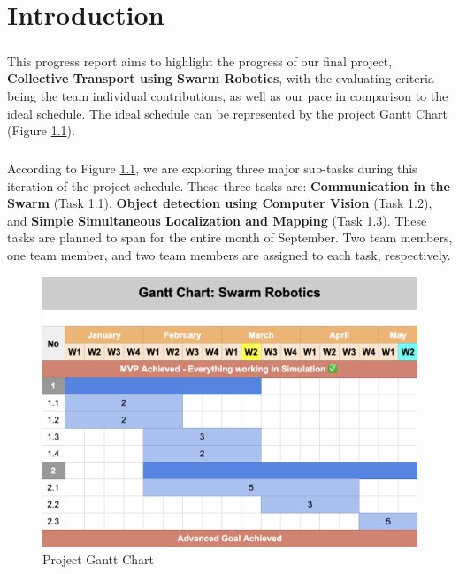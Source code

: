 \chapter{Introduction}

\paragraph*{}
This progress report aims to highlight the progress of our final project, \textbf{Collective Transport using Swarm Robotics}, with the evaluating criteria being the team individual contributions, as well as our pace in comparison to the ideal schedule. The ideal schedule can be represented by the project Gantt Chart (Figure \ref{fig:gantt_chart}).

\paragraph*{}
According to Figure \ref{fig:gantt_chart}, we are exploring three major sub-tasks during this iteration of the project schedule. These three tasks are: \textbf{Communication in the Swarm} (Task 1.1), \textbf{Object detection using Computer Vision} (Task 1.2), and \textbf{Simple Simultaneous Localization and Mapping} (Task 1.3). These tasks are planned to span for the entire month of September. Two team members, one team member, and two team members are assigned to each task, respectively.

\begin{figure}[H]
    \centering
    \includegraphics[width=1\linewidth]{assets/images/timeline/gantt_chart.png}
    \caption{Project Gantt Chart}
    \label{fig:gantt_chart}
\end{figure}
